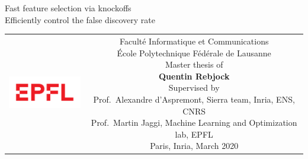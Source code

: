 \begin{titlepage}
\begin{center}
\sffamily


\null\vspace{2cm}
{\huge Fast feature selection via knockoffs\\[12pt] Efficiently control the false discovery rate} \\[24pt]

\vfill

\begin{tabular} {cc}
\parbox{0.3\textwidth}{\includegraphics[width=4cm]{figures/epfl}}
&
\parbox{0.7\textwidth}{%
	Faculté Informatique et Communications\\
	École Polytechnique Fédérale de Lausanne\\
	Master thesis of\\[4pt]
	\null \hspace{3em} \textbf{Quentin Rebjock}\\[9pt]
%
\small
Supervised by\\[4pt]
%
    Prof.\ Alexandre d'Aspremont, Sierra team, Inria, ENS, CNRS\\
    Prof.\ Martin Jaggi, Machine Learning and Optimization lab, EPFL\\[12pt]
%
Paris, Inria, March 2020}
\end{tabular}
\end{center}
\vspace{2cm}
\end{titlepage}
